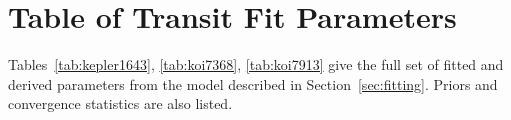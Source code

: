 \documentclass[12pt,twocolumn,linenumbers]{aastex63}
\begin{document}
\section{Table of Transit Fit Parameters}
\label{app:transit}

Tables~\ref{tab:kepler1643}, \ref{tab:koi7368}, \ref{tab:koi7913} give
the full set of fitted and derived parameters from the model described in
Section~\ref{sec:fitting}.
Priors and convergence statistics are also listed.









\end{document}
